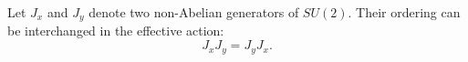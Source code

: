 \documentclass{article}
\begin{document}
Let $J_x$ and $J_y$ denote two non-Abelian generators of $SU(2)$.  Their
ordering can be interchanged in the effective action:
\begin{equation}
J_x J_y = J_y J_x .
\label{eq:nonabelian-exchange}
\end{equation}
\end{document}
